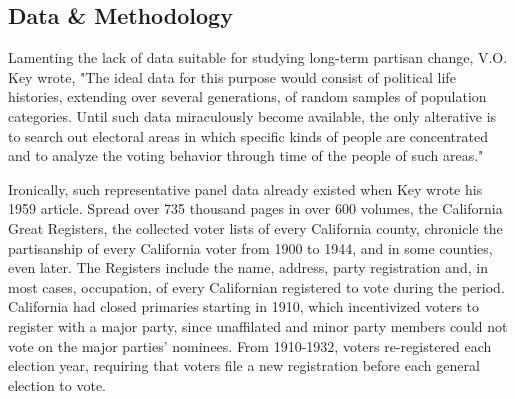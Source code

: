 \documentclass[11pt]{scrartcl}\usepackage[]{graphicx}\usepackage[]{color}
\begin{document}
\subsection*{Data \& Methodology}

Lamenting the lack of data suitable for studying long-term partisan change, V.O. Key \citeyearpar{key1959secular} wrote, "The ideal data for this purpose would consist of political life histories, extending over several generations, of random samples of population categories. Until such data miraculously become available, the only alterative is to search out electoral areas in which specific kinds of people are concentrated and to analyze the voting behavior through time of the people of such areas."

Ironically, such representative panel data already existed when Key wrote his 1959 article. Spread over 735 thousand pages in over 600 volumes, the California Great Registers, the collected voter lists of every California county, chronicle the partisanship of every California voter from 1900 to 1944, and in some counties, even later.  The Registers include the name, address, party registration and, in most cases, occupation, of every Californian registered to vote during the period. California had closed primaries starting in 1910, which incentivized voters to register with a major party, since unaffilated and minor party members could not vote on the major parties' nominees.   From 1910-1932, voters re-registered each election year, requiring that voters file a new registration before each general election to vote. 

\end{document}
